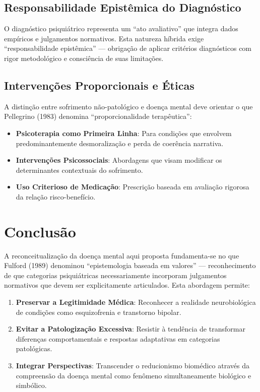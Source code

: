 \subsection{Responsabilidade Epistêmica do Diagnóstico}

O diagnóstico psiquiátrico representa um \enquote{ato avaliativo} que integra dados empíricos e julgamentos normativos. Esta natureza híbrida exige \enquote{responsabilidade epistêmica} --- obrigação de aplicar critérios diagnósticos com rigor metodológico e consciência de suas limitações.

\subsection{Intervenções Proporcionais e Éticas}

A distinção entre sofrimento não-patológico e doença mental deve orientar o que Pellegrino (1983) denomina \enquote{proporcionalidade terapêutica}:

\begin{itemize}
\item \textbf{Psicoterapia como Primeira Linha}: Para condições que envolvem predominantemente desmoralização e perda de coerência narrativa.

\item \textbf{Intervenções Psicossociais}: Abordagens que visam modificar os determinantes contextuais do sofrimento.

\item \textbf{Uso Criterioso de Medicação}: Prescrição baseada em avaliação rigorosa da relação risco-benefício.
\end{itemize}

\section{Conclusão}
\label{sec:conclusao-doenca}

A reconceitualização da doença mental aqui proposta fundamenta-se no que Fulford (1989) denominou \enquote{epistemologia baseada em valores} --- reconhecimento de que categorias psiquiátricas necessariamente incorporam julgamentos normativos que devem ser explicitamente articulados. Esta abordagem permite:

\begin{enumerate}
\item \textbf{Preservar a Legitimidade Médica}: Reconhecer a realidade neurobiológica de condições como esquizofrenia e transtorno bipolar.

\item \textbf{Evitar a Patologização Excessiva}: Resistir à tendência de transformar diferenças comportamentais e respostas adaptativas em categorias patológicas.

\item \textbf{Integrar Perspectivas}: Transcender o reducionismo biomédico através da compreensão da doença mental como fenômeno simultaneamente biológico e simbólico.
\end{enumerate}

